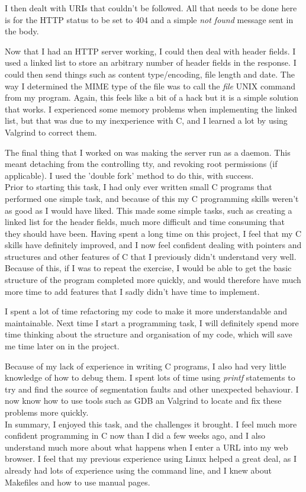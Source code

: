 \documentclass[a4paper]{article}
\begin{document}
I then dealt with URIs that couldn't be followed. All that needs to be done here
is for the HTTP status to be set to 404 and a simple {\it not found} message
sent in the body.

Now that I had an HTTP server working, I could then deal with header fields. I
used a linked list to store an arbitrary number of header fields in the
response. I could then send things such as content type/encoding, file length
and date. The way I determined the MIME type of the file was to call the {\it
  file} UNIX command from my program. Again, this feels like a bit of a hack but
it is a simple solution that works. I experienced some memory problems when
implementing the linked list, but that was due to my inexperience with C, and I
learned a lot by using Valgrind to correct them.

The final thing that I worked on was making the server run as a daemon. This
meant detaching from the controlling tty, and revoking root permissions (if
applicable). I used the 'double fork' method to do this, with success.\\


Prior to starting this task, I had only ever written small C programs that
performed one simple task, and because of this my C programming skills weren't
as good as I would have liked. This made some simple tasks, such as creating a
linked list for the header fields, much more difficult and time consuming that
they should have been. Having spent a long time on this project, I feel that my
C skills have definitely improved, and I now feel confident dealing with
pointers and structures and other features of C that I previously didn't
understand very well. Because of this, if I was to repeat the exercise, I would
be able to get the basic structure of the program completed more quickly, and
would therefore have much more time to add features that I sadly didn't have
time to implement.

I spent a lot of time refactoring my code to make it more understandable and
maintainable. Next time I start a programming task, I will definitely spend more
time thinking about the structure and organisation of my code, which will save
me time later on in the project.

Because of my lack of experience in writing C programs, I also had very little
knowledge of how to debug them. I spent lots of time using {\it printf}
statements to try and find the source of segmentation faults and other
unexpected behaviour. I now know how to use tools such as GDB an Valgrind to
locate and fix these problems more quickly.\\

In summary, I enjoyed this task, and the challenges it brought. I feel much more
confident programming in C now than I did a few weeks ago, and I also understand
much more about what happens when I enter a URL into my web browser. I feel that
my previous experience using Linux helped a great deal, as I already had lots of
experience using the command line, and I knew about Makefiles and how to use
manual pages.
\end{document}
